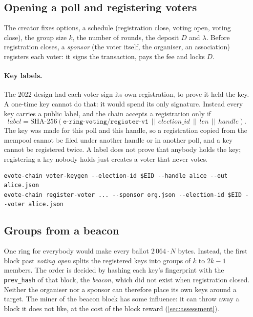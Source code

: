 \documentclass[11pt,a4paper]{article}
\theoremstyle{definition}
\begin{document}
\subsection{Opening a poll and registering voters}
\label{sec:labels}

The creator fixes options, a schedule (registration close, voting open,
voting close), the group size $k$, the number of rounds, the deposit $D$
and $\lambda$. Before registration closes, a \emph{sponsor} (the voter
itself, the organiser, an association) registers each voter: it signs the
transaction, pays the fee and locks $D$.

\paragraph{Key labels.} The 2022 design had each voter sign its own
registration, to prove it held the key. A one-time key cannot do that:
it would spend its only signature. Instead every key carries a public
label, and the chain accepts a registration only if
\[ \mathit{label} = \mathrm{SHA\text{-}256}(\texttt{e-ring-voting/register-v1}
   \,\|\, \mathit{election\_id} \,\|\, \mathit{len} \,\|\,
   \mathit{handle}). \]
The key was made for this poll and this handle, so a registration copied
from the mempool cannot be filed under another handle or in another poll,
and a key cannot be registered twice. A label does not prove that anybody
holds the key; registering a key nobody holds just creates a voter that
never votes.

\begin{lstlisting}[style=shell]
evote-chain voter-keygen --election-id $EID --handle alice --out alice.json
evote-chain register-voter ... --sponsor org.json --election-id $EID --voter alice.json
\end{lstlisting}

\subsection{Groups from a beacon}
\label{sec:groups}

One ring for everybody would make every ballot $2\,064 \cdot N$ bytes.
Instead, the first block past \emph{voting open} splits the registered keys
into groups of $k$ to $2k - 1$ members. The order is decided by hashing
each key's fingerprint with the \texttt{prev\_hash} of that block, the
\emph{beacon}, which did not exist when registration closed. Neither the
organiser nor a sponsor can therefore place its own keys around a target.
The miner of the beacon block has some influence: it can throw away a block
it does not like, at the cost of the block reward (\cref{sec:assessment}).
\end{document}
